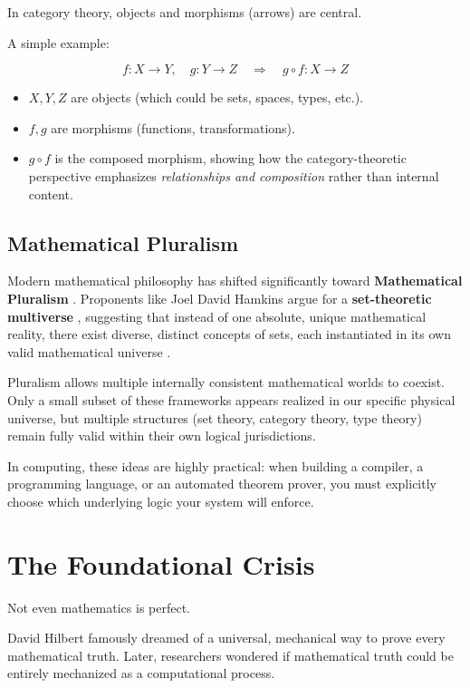In category theory, objects and morphisms (arrows) are central.

A simple example:

\[
f: X \to Y, \quad g: Y \to Z \quad \Rightarrow \quad g \circ f: X \to Z
\]

\begin{itemize}
\item $X, Y, Z$ are objects (which could be sets, spaces, types, etc.).  
\item $f, g$ are morphisms (functions, transformations).  
\item $g \circ f$ is the composed morphism, showing how the category-theoretic perspective emphasizes \emph{relationships and composition} rather than internal content.
\end{itemize}

\subsection*{Mathematical Pluralism}

Modern mathematical philosophy has shifted significantly toward \textbf{Mathematical Pluralism} \cite{friend2014pluralism}.
Proponents like Joel David Hamkins argue for a \textbf{set-theoretic multiverse} \cite{hamkins2012multiverse}, suggesting that instead of one absolute, unique mathematical reality, there exist diverse, distinct concepts of sets, each instantiated in its own valid mathematical universe \cite{priest2024mathematical}.

Pluralism allows multiple internally consistent mathematical worlds to coexist.
Only a small subset of these frameworks appears realized in our specific physical universe, but multiple structures (set theory, category theory, type theory) remain fully valid within their own logical jurisdictions.

In computing, these ideas are highly practical: when building a compiler, a programming language, or an automated theorem prover, you must explicitly choose which underlying logic your system will enforce.


\section{The Foundational Crisis}

Not even mathematics is perfect.

David Hilbert famously dreamed of a universal, mechanical way to prove every mathematical truth.
Later, researchers wondered if mathematical truth could be entirely mechanized as a computational process.

